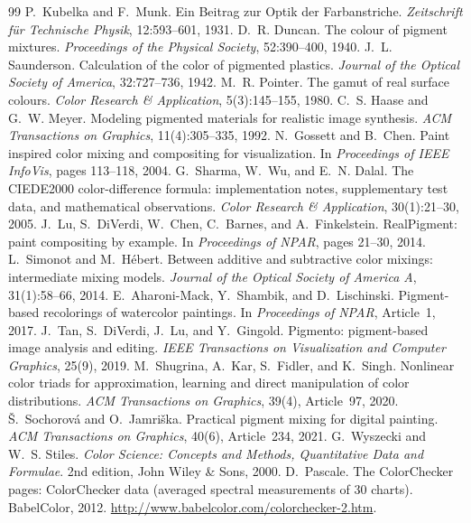\documentclass[UTF8,11pt,a4paper,fontset=fandol]{ctexart}
\begin{document}
\begin{thebibliography}{99}
 P.~Kubelka and F.~Munk. Ein Beitrag zur Optik der Farbanstriche. \emph{Zeitschrift f\"ur Technische Physik}, 12:593--601, 1931.
 D.~R. Duncan. The colour of pigment mixtures. \emph{Proceedings of the Physical Society}, 52:390--400, 1940.
 J.~L. Saunderson. Calculation of the color of pigmented plastics. \emph{Journal of the Optical Society of America}, 32:727--736, 1942.
 M.~R. Pointer. The gamut of real surface colours. \emph{Color Research \& Application}, 5(3):145--155, 1980.
 C.~S. Haase and G.~W. Meyer. Modeling pigmented materials for realistic image synthesis. \emph{ACM Transactions on Graphics}, 11(4):305--335, 1992.
 N.~Gossett and B.~Chen. Paint inspired color mixing and compositing for visualization. In \emph{Proceedings of IEEE InfoVis}, pages 113--118, 2004.
 G.~Sharma, W.~Wu, and E.~N. Dalal. The CIEDE2000 color-difference formula: implementation notes, supplementary test data, and mathematical observations. \emph{Color Research \& Application}, 30(1):21--30, 2005.
 J.~Lu, S.~DiVerdi, W.~Chen, C.~Barnes, and A.~Finkelstein. RealPigment: paint compositing by example. In \emph{Proceedings of NPAR}, pages 21--30, 2014.
 L.~Simonot and M.~H\'ebert. Between additive and subtractive color mixings: intermediate mixing models. \emph{Journal of the Optical Society of America A}, 31(1):58--66, 2014.
 E.~Aharoni-Mack, Y.~Shambik, and D.~Lischinski. Pigment-based recolorings of watercolor paintings. In \emph{Proceedings of NPAR}, Article~1, 2017.
 J.~Tan, S.~DiVerdi, J.~Lu, and Y.~Gingold. Pigmento: pigment-based image analysis and editing. \emph{IEEE Transactions on Visualization and Computer Graphics}, 25(9), 2019.
 M.~Shugrina, A.~Kar, S.~Fidler, and K.~Singh. Nonlinear color triads for approximation, learning and direct manipulation of color distributions. \emph{ACM Transactions on Graphics}, 39(4), Article~97, 2020.
 \v{S}.~Sochorov\'a and O.~Jamri\v{s}ka. Practical pigment mixing for digital painting. \emph{ACM Transactions on Graphics}, 40(6), Article~234, 2021.
 G.~Wyszecki and W.~S. Stiles. \emph{Color Science: Concepts and Methods, Quantitative Data and Formulae}. 2nd edition, John Wiley \& Sons, 2000.
 D.~Pascale. The ColorChecker pages: ColorChecker data (averaged spectral measurements of 30 charts). BabelColor, 2012. \url{http://www.babelcolor.com/colorchecker-2.htm}.
\end{thebibliography}


\end{document}
